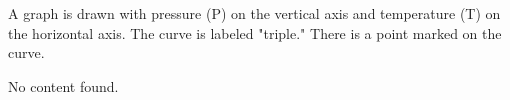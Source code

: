 A graph is drawn with pressure (P) on the vertical axis and temperature (T) on the horizontal axis. The curve is labeled "triple." There is a point marked on the curve.

No content found.